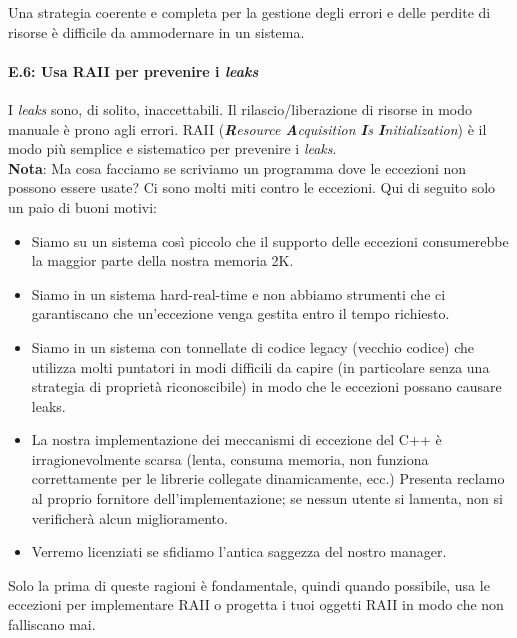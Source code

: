\textsf{\small Una strategia coerente e completa per la gestione degli errori e delle perdite di risorse è difficile da ammodernare in un sistema.} \\

\paragraph{E.6: Usa RAII per prevenire i \emph{leaks}}

\textsf{\small I \emph{leaks} sono, di solito, inaccettabili. Il rilascio/liberazione di risorse in modo manuale è prono agli errori. RAII (\emph{\textbf{R}esource \textbf{A}cquisition \textbf{I}s \textbf{I}nitialization}) è il modo più semplice e sistematico per prevenire i \emph{leaks}.} \\

\textsf{\small \textbf{Nota}: Ma cosa facciamo se scriviamo un programma dove le eccezioni non possono essere usate? Ci sono molti miti contro le eccezioni. Qui di seguito solo un paio di buoni motivi: } \\

\begin{itemize}
	\item \textsf{\small Siamo su un sistema così piccolo che il supporto delle eccezioni consumerebbe la maggior parte della nostra memoria 2K.}
	\item \textsf{\small Siamo in un sistema hard-real-time e non abbiamo strumenti che ci garantiscano che un'eccezione venga gestita entro il tempo richiesto.}
	\item \textsf{\small Siamo in un sistema con tonnellate di codice legacy (vecchio codice) che utilizza molti puntatori in modi difficili da capire (in particolare senza una strategia di proprietà riconoscibile) in modo che le eccezioni possano causare leaks.}
	\item \textsf{\small La nostra implementazione dei meccanismi di eccezione del C++ è irragionevolmente scarsa (lenta, consuma memoria, non funziona correttamente per le librerie collegate dinamicamente, ecc.) Presenta reclamo al proprio fornitore dell'implementazione; se nessun utente si lamenta, non si verificherà alcun miglioramento.}
	\item \textsf{\small Verremo licenziati se sfidiamo l'antica saggezza del nostro manager.}
\end{itemize}

\textsf{\small Solo la prima di queste ragioni è fondamentale, quindi quando possibile, usa le eccezioni per implementare RAII o progetta i tuoi oggetti RAII in modo che non falliscano mai.} \\

